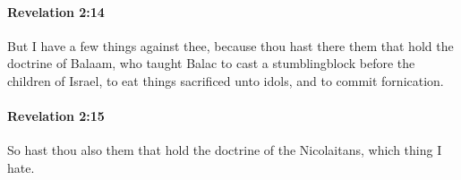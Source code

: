 		\paragraph{Revelation 2:14} %
			\label{REVELATIONNT-2-14}

			But I have a few things against thee, because thou hast there them that hold the doctrine of Balaam, who taught Balac to cast a stumblingblock before the children of Israel, to eat things sacrificed unto idols, and to commit fornication.

			\begin{framed}
			\scriptsize
				\begin{compactdesc}
					\item[SBLG] 
				\end{compactdesc}
			\end{framed}

		\paragraph{Revelation 2:15} %
			\label{REVELATIONNT-2-15}

			So hast thou also them that hold the doctrine of the Nicolaitans, which thing I hate.

